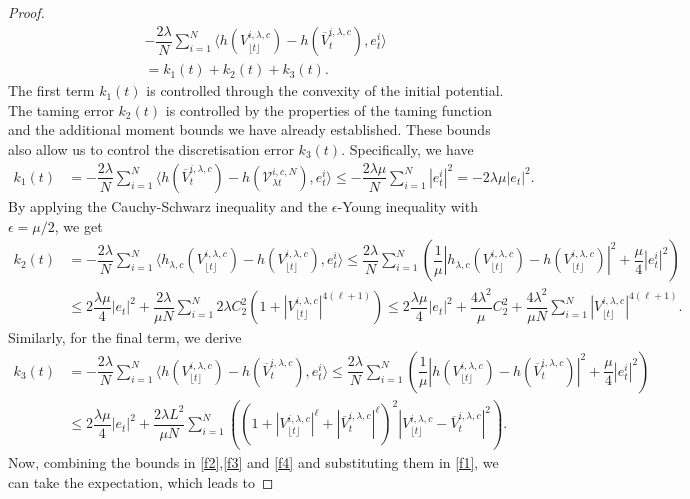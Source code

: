 \documentclass[a4paper, 10pt]{article}
\theoremstyle{plain}%
\begin{document}
\begin{proof}
\begin{align}
&-\dfrac{2\lambda}{N}\sum_{i=1}^N\langle  h(V_{\lfloor{t}\rfloor}^{i,\lambda,c})-h(\overline{V}_{t}^{i,\lambda,c}), e_t^i\rangle\nonumber\\
&=k_1(t)+k_2(t)+k_3(t).\label{f1}
\end{align}
The first term $k_1(t)$ is controlled through the convexity of the initial potential. The taming error $k_2(t)$ is controlled by the properties of the taming function and the additional moment bounds we have already established. These bounds also allow us to control the discretisation error $k_3(t)$. Specifically, we have
\begin{align}
k_1(t)&=-\dfrac{2\lambda}{N}\sum_{i=1}^N\langle  h(\overline{V}_{t}^{i,\lambda,c})-h(\mathcal{V}_{\lambda t}^{i,c,N}), e_t^i\rangle\leq-\dfrac{2\lambda\mu}{N}\sum_{i=1}^N |e_t^i|^2=-2\lambda\mu|e_t|^2.\label{f2}
\end{align}
By applying the Cauchy-Schwarz inequality and the $\epsilon$-Young inequality with $\epsilon=\mu/2$, we get
\begin{align}
k_2(t)&=-\dfrac{2\lambda}{N}\sum_{i=1}^N\langle  h_{\lambda,c}(V_{\lfloor{t}\rfloor}^{i,\lambda,c})-h(V_{\lfloor{t}\rfloor}^{i,\lambda,c}), e_t^i\rangle\leq\dfrac{2\lambda}{N}\sum_{i=1}^N\left(\dfrac{1}{\mu}|h_{\lambda,c}(V_{\lfloor{t}\rfloor}^{i,\lambda,c})-h(V_{\lfloor{t}\rfloor}^{i,\lambda,c})|^2+\dfrac{\mu}{4}|e_t^i|^2\right)\nonumber\\
&\leq 2\dfrac{\lambda\mu}{4} |e_t|^2+\dfrac{2\lambda}{\mu N}\sum_{i=1}^N2\lambda C_2^2(1+|V_{\lfloor{t}\rfloor}^{i,\lambda,c}|^{4(\ell+1)})\leq 2\dfrac{\lambda\mu}{4} |e_t|^2+\dfrac{4\lambda^2}{\mu } C_2^2+\dfrac{4\lambda^2}{\mu N}\sum_{i=1}^N|V_{\lfloor{t}\rfloor}^{i,\lambda,c}|^{4(\ell+1)}.\label{f3}
\end{align}
Similarly, for the final term, we derive
\begin{align}
k_3(t)&=-\dfrac{2\lambda}{N}\sum_{i=1}^N\langle  h(V_{\lfloor{t}\rfloor}^{i,\lambda,c})-h(\overline{V}_{t}^{i,\lambda,c}), e_t^i\rangle\leq\dfrac{2\lambda}{N}\sum_{i=1}^N\left(\dfrac{1}{\mu}| h(V_{\lfloor{t}\rfloor}^{i,\lambda,c})-h(\overline{V}_{t}^{i,\lambda,c})|^2+\dfrac{\mu}{4}|e_t^i|^2\right)\nonumber\\
&\leq2\dfrac{\lambda\mu}{4}|e_t|^2+\dfrac{2\lambda L^2}{\mu N}\sum_{i=1}^N \left((1+|V_{\lfloor{t}\rfloor}^{i,\lambda,c}|^{\ell}+|\overline{V}_{t}^{i,\lambda,c}|^{\ell})^2|V_{\lfloor{t}\rfloor}^{i,\lambda,c}-\overline{V}_{t}^{i,\lambda,c}|^2\right).\label{f4}
\end{align}
Now, combining the bounds in \eqref{f2},\eqref{f3} and \eqref{f4} and substituting them in \eqref{f1}, we can take the expectation, which leads to

\end{proof}
\end{document}
